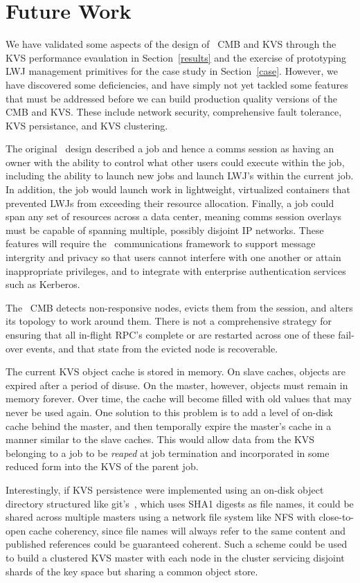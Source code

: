 \section{Future Work}

We have validated some aspects of the design of \flux\ CMB and KVS
through the KVS performance evaulation in Section~\ref{results}
and the exercise of prototyping LWJ management primitives for the
case study in Section~\ref{case}.  However, we have discovered some
deficiencies, and have simply not yet tackled some features
that must be addressed before we can build production
quality versions of the CMB and KVS.
These include network security, comprehensive fault tolerance,
KVS persistance, and KVS clustering.

The original \flux\ design described a job and hence a comms session
as having an owner with the ability to control what other users could
execute within the job, including the ability to launch new jobs and
launch LWJ's within the current job.  In addition, the job would launch
work in lightweight, virtualized containers that prevented LWJs from
exceeding their resource allocation.  Finally, a job could span any set
of resources across a data center, meaning comms session overlays must
be capable of spanning multiple, possibly disjoint IP networks.
These features will require the \flux\ communications framework to
support message intergrity and privacy so that users cannot interfere
with one another or attain inappropriate privileges, and to integrate with
enterprise authentication services such as Kerberos.

The \flux\ CMB detects non-responsive nodes, evicts them from
the session, and alters its topology to work around them.
There is not a comprehensive strategy for ensuring that all in-flight
RPC's complete or are restarted across one of these fail-over events,
and that state from the evicted node is recoverable.

The current KVS object cache is stored in memory.
On slave caches, objects are expired after a period of disuse.
On the master, however, objects must remain in memory forever.
Over time, the cache will become filled with old values that may never
be used again.  One solution to this problem is to add a level of
on-disk cache behind the master, and then temporally expire the master's
cache in a manner similar to the slave caches.  This would allow data from
the KVS belonging to a job to be {\em reaped} at job termination and
incorporated in some reduced form into the KVS of the parent job.

Interestingly, if KVS persistence were implemented using an on-disk
object directory structured like git's~\cite{Chacon:2009:PG:1618548},
which uses SHA1 digests as file names, it could be shared across multiple
masters using a network file system like NFS with close-to-open cache
coherency, since file names will always refer to the same content and
published references could be guaranteed coherent.
Such a scheme could be used to build a clustered KVS master with each
node in the cluster servicing disjoint shards of the key space but
sharing a common object store.

